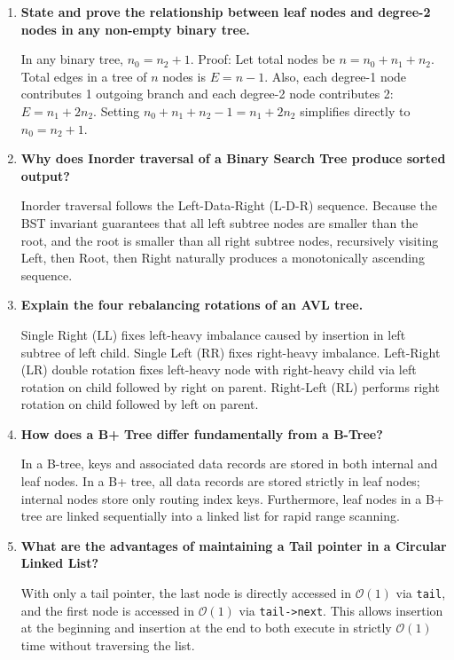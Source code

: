 \documentclass[12pt,a4paper]{article}
\newcommand{\Q}[1]{\textbf{#1}\par\noindent\ignorespaces}
\begin{document}
\begin{tcolorbox}[exambox, title={\textbf{Frequently Asked / Viva Questions (Part 1)}}]
\begin{enumerate}[topsep=0pt, label=\textbf{Q\arabic*.}, itemsep=4pt]
  \item \Q{State and prove the relationship between leaf nodes and degree-2 nodes in any non-empty binary tree.}
  In any binary tree, $n_0 = n_2 + 1$. Proof: Let total nodes be $n = n_0 + n_1 + n_2$. Total edges in a tree of $n$ nodes is $E = n - 1$. Also, each degree-1 node contributes 1 outgoing branch and each degree-2 node contributes 2: $E = n_1 + 2n_2$. Setting $n_0 + n_1 + n_2 - 1 = n_1 + 2n_2$ simplifies directly to $n_0 = n_2 + 1$.

  \item \Q{Why does Inorder traversal of a Binary Search Tree produce sorted output?}
  Inorder traversal follows the Left-Data-Right (L-D-R) sequence. Because the BST invariant guarantees that all left subtree nodes are smaller than the root, and the root is smaller than all right subtree nodes, recursively visiting Left, then Root, then Right naturally produces a monotonically ascending sequence.

  \item \Q{Explain the four rebalancing rotations of an AVL tree.}
  Single Right (LL) fixes left-heavy imbalance caused by insertion in left subtree of left child. Single Left (RR) fixes right-heavy imbalance. Left-Right (LR) double rotation fixes left-heavy node with right-heavy child via left rotation on child followed by right on parent. Right-Left (RL) performs right rotation on child followed by left on parent.

  \item \Q{How does a B+ Tree differ fundamentally from a B-Tree?}
  In a B-tree, keys and associated data records are stored in both internal and leaf nodes. In a B+ tree, all data records are stored strictly in leaf nodes; internal nodes store only routing index keys. Furthermore, leaf nodes in a B+ tree are linked sequentially into a linked list for rapid range scanning.

  \item \Q{What are the advantages of maintaining a Tail pointer in a Circular Linked List?}
  With only a tail pointer, the last node is directly accessed in $\mathcal{O}(1)$ via \texttt{tail}, and the first node is accessed in $\mathcal{O}(1)$ via \texttt{tail->next}. This allows insertion at the beginning and insertion at the end to both execute in strictly $\mathcal{O}(1)$ time without traversing the list.


\end{enumerate}
\end{tcolorbox}
\end{document}
